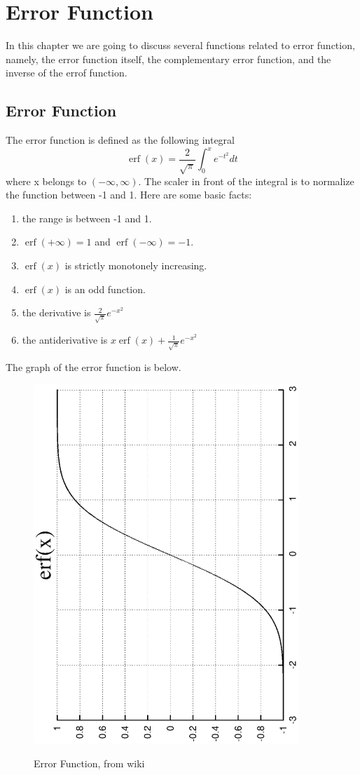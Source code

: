 \chapter{Error Function}
\minitoc
In this chapter we are going to discuss several functions related to error function, namely, the error function itself, the complementary error function, and the inverse of the errof function.


\section{Error Function}
The error function is defined as the following integral
\[ \operatorname{erf}(x) = \frac{2}{\sqrt{\pi}} \int_0^x e^{-t^2}dt\]
where x belongs to $(-\infty, \infty)$. The scaler in front of the integral is to normalize the function between -1 and 1. Here are some basic facts:
\begin{enumerate}
\item the range is between -1 and 1.
\item $\operatorname{erf}(+\infty) = 1$ and $\operatorname{erf}(-\infty) = -1$.
\item $\operatorname{erf}(x)$ is strictly monotonely increasing.
\item $\operatorname{erf}(x)$ is an odd function.
\item the derivative is $\frac{2}{\sqrt{\pi}}e^{-x^2}$
\item the antiderivative is $x\operatorname{erf}(x) + \frac{1}{\sqrt{\pi}}e^{-x^2}$
\end{enumerate} 
The graph of the error function is below. 
\begin{figure}[htp]
\begin{center}
{
\includegraphics[angle=-90,width=100mm]{chap2/erf.eps}
}
\end{center}
\caption{Error Function, from wiki}
\label{figure:errorfunction}
\end{figure}

